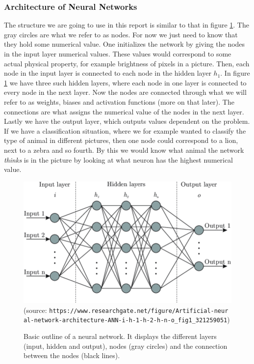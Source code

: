 \documentclass[12pt]{extarticle}
\begin{document}
\subsubsection{Architecture of Neural Networks}
The structure we are going to use in this report is similar to that in figure \ref{fig:neural_network}. The gray circles are what we refer to as nodes. For now we just need to know that they hold some numerical value. One initializes the network by giving the nodes in the input layer numerical values. These values would correspond to some actual physical property, for example brightness of pixels in a picture. Then, each node in the input layer is connected to each node in the hidden layer $h_1$. In figure \ref{fig:neural_network} we have three such hidden layers, where each node in one layer is connected to every node in the next layer. Now the nodes are connected through what we will refer to as weights, biases and activation functions (more on that later). The connections are what assigns the numerical value of the nodes in the next layer. Lastly we have the output layer, which outputs values dependent on the problem. If we have a classification situation, where we for example wanted to classify the type of animal in different pictures, then one node could correspond to  a lion, next to a zebra and so fourth. By this we would know what animal the network \textit{thinks} is in the picture by looking at what neuron has the highest numerical value.

\begin{figure}[h]
	\includegraphics[width=\linewidth]{pictures/neural_network.png}
	(source: \texttt{https://www.researchgate.net/figure/Artificial-neur
		al-network-architecture-ANN-i-h-1-h-2-h-n-o\_fig1\_321259051})
	\endminipage\hfill
	\caption{Basic outline of a neural network. It displays the different layers (input, hidden and output), nodes (gray circles) and the connection between the nodes (black lines).}\label{fig:neural_network}
	\endminipage
\end{figure}
\end{document}
